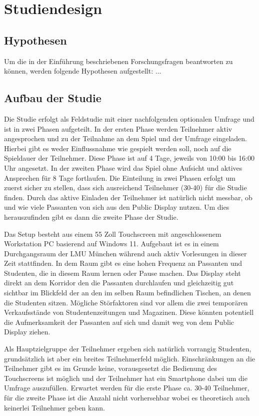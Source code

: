 \chapter{Studiendesign}
\section{Hypothesen}
Um die in der Einführung beschriebenen Forschungsfragen beantworten zu können, werden folgende Hypothesen aufgestellt:
...
\section{Aufbau der Studie}
Die Studie erfolgt als Feldstudie mit einer nachfolgenden optionalen Umfrage und ist in zwei Phasen aufgeteilt. 
In der ersten Phase werden Teilnehmer aktiv angesprochen und zu der Teilnahme an dem Spiel und der Umfrage eingeladen. 
Hierbei gibt es weder Einflussnahme wie gespielt werden soll, noch auf die Spieldauer der Teilnehmer. 
Diese Phase ist auf 4 Tage, jeweils von 10:00 bis 16:00 Uhr angesetzt. 
In der zweiten Phase wird das Spiel ohne Aufsicht und aktives Ansprechen für 8 Tage fortlaufen. 
Die Einteilung in zwei Phasen erfolgt um zuerst sicher zu stellen, dass sich ausreichend Teilnehmer (30-40) für die Studie finden. 
Durch das aktive Einladen der Teilnehmer ist natürlich nicht messbar, ob und wie viele Passanten von sich aus den Public Display nutzen. 
Um dies herauszufinden gibt es dann die zweite Phase der Studie.

Das Setup besteht aus einem 55 Zoll Touchscreen mit angeschlossenem Workstation PC basierend auf Windows 11. 
Aufgebaut ist es in einem Durchgangsraum der LMU München während auch aktiv Vorlesungen in dieser Zeit stattfinden. 
In dem Raum gibt es eine hohen Frequenz an Passanten und Studenten, die in diesem Raum lernen oder Pause machen. 
Das Display steht direkt an dem Korridor den die Passanten durchlaufen und gleichzeitig gut sichtbar im Blickfeld der an den im selben Raum befindlichen Tischen, 
an denen die Studenten sitzen. Mögliche Störfaktoren sind vor allem die zwei temporären Verkaufsstände von Studentenzeitungen und Magazinen. 
Diese könnten potentiell die Aufmerksamkeit der Passanten auf sich und damit weg von dem Public Display ziehen.

Als Hauptzielgruppe der Teilnehmer ergeben sich natürlich vorrangig Studenten, grundsätzlich ist aber ein breites Teilnehmerfeld möglich. 
Einschränkungen an die Teilnehmer gibt es im Grunde keine, vorausgesetzt die Bedienung des Touchscreens ist möglich und der Teilnehmer hat ein Smartphone dabei um die Umfrage auszufüllen. 
Erwartet werden für die erste Phase ca. 30-40 Teilnehmer, für die zweite Phase ist die Anzahl nicht vorhersehbar wobei es theoretisch auch keinerlei Teilnehmer geben kann.


